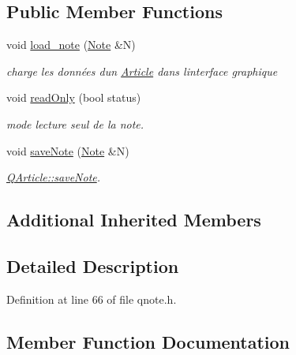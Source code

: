 \subsection*{Public Member Functions}
\begin{DoxyCompactItemize}
\item 
void \hyperlink{class_q_article_aea21c10581abe74709317283739e9552}{load\+\_\+note} (\hyperlink{class_note}{Note} \&N)
\begin{DoxyCompactList}\small\item\em charge les données d\textquotesingle{}un \hyperlink{class_article}{Article} dans l\textquotesingle{}interface graphique \end{DoxyCompactList}\item 
void \hyperlink{class_q_article_af6c14f4ce3df750a0e1a22207309068e}{read\+Only} (bool status)
\begin{DoxyCompactList}\small\item\em mode lecture seul de la note. \end{DoxyCompactList}\item 
void \hyperlink{class_q_article_ae59d03688947d16b86f9ab10384894ec}{save\+Note} (\hyperlink{class_note}{Note} \&N)
\begin{DoxyCompactList}\small\item\em \hyperlink{class_q_article_ae59d03688947d16b86f9ab10384894ec}{Q\+Article\+::save\+Note}. \end{DoxyCompactList}\end{DoxyCompactItemize}
\subsection*{Additional Inherited Members}


\subsection{Detailed Description}


Definition at line 66 of file qnote.\+h.



\subsection{Member Function Documentation}
\mbox{\label{class_q_article_aea21c10581abe74709317283739e9552}} 
